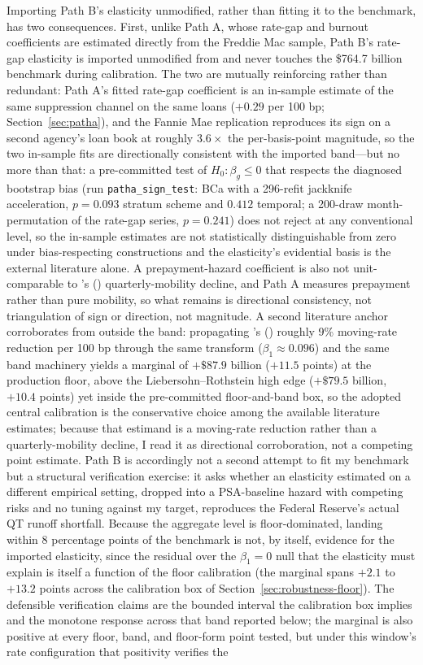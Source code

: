 \documentclass[12pt]{article}
\newcommand{\citepos}[1]{\citeauthor{#1}'s (\citeyear{#1})}
\begin{document}
Importing Path B's elasticity unmodified, rather than fitting it to the benchmark, has two consequences. First, unlike Path A, whose rate-gap and burnout coefficients are estimated directly from the Freddie Mac sample, Path B's rate-gap elasticity is imported unmodified from \citet{liebersohn2024} and never touches the \$764.7 billion benchmark during calibration. The two are mutually reinforcing rather than redundant: Path A's fitted rate-gap coefficient is an in-sample estimate of the same suppression channel on the same loans ($+0.29$ per 100 bp; Section~\ref{sec:patha}), and the Fannie Mae replication reproduces its sign on a second agency's loan book at roughly $3.6\times$ the per-basis-point magnitude, so the two in-sample fits are directionally consistent with the imported band---but no more than that: a pre-committed test of $H_0\!: \beta_g \le 0$ that respects the diagnosed bootstrap bias (run \texttt{patha\_sign\_test}: BCa with a 296-refit jackknife acceleration, $p = 0.093$ stratum scheme and $0.412$ temporal; a 200-draw month-permutation of the rate-gap series, $p = 0.241$) does not reject at any conventional level, so the in-sample estimates are not statistically distinguishable from zero under bias-respecting constructions and the elasticity's evidential basis is the external literature alone. A prepayment-hazard coefficient is also not unit-comparable to \citepos{liebersohn2024} quarterly-mobility decline, and Path A measures prepayment rather than pure mobility, so what remains is directional consistency, not triangulation of sign or direction, not magnitude. A second literature anchor corroborates from outside the band: propagating \citepos{fonseca2024} roughly 9\% moving-rate reduction per 100 bp through the same transform ($\beta_1 \approx 0.096$) and the same band machinery yields a marginal of $+\$87.9$ billion ($+11.5$ points) at the production floor, above the Liebersohn--Rothstein high edge ($+\$79.5$ billion, $+10.4$ points) yet inside the pre-committed floor-and-band box, so the adopted central calibration is the conservative choice among the available literature estimates; because that estimand is a moving-rate reduction rather than a quarterly-mobility decline, I read it as directional corroboration, not a competing point estimate. Path B is accordingly not a second attempt to fit my benchmark but a structural verification exercise: it asks whether an elasticity estimated on a different empirical setting, dropped into a PSA-baseline hazard with competing risks and no tuning against my target, reproduces the Federal Reserve's actual QT runoff shortfall. Because the aggregate level is floor-dominated, landing within 8 percentage points of the benchmark is not, by itself, evidence for the imported elasticity, since the residual over the $\beta_1 = 0$ null that the elasticity must explain is itself a function of the floor calibration (the marginal spans $+2.1$ to $+13.2$ points across the calibration box of Section~\ref{sec:robustness-floor}). The defensible verification claims are the bounded interval the calibration box implies and the monotone response across that band reported below; the marginal is also positive at every floor, band, and floor-form point tested, but under this window's rate configuration that positivity verifies the 
\end{document}
